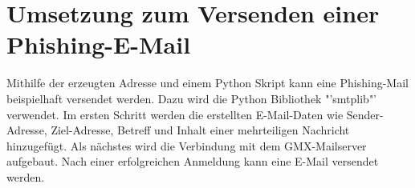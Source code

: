 \section{Umsetzung zum Versenden einer Phishing-E-Mail}
Mithilfe der erzeugten Adresse und einem Python Skript kann eine Phishing-Mail beispielhaft versendet werden. Dazu wird die Python Bibliothek "'smtplib"' verwendet. Im ersten Schritt werden die erstellten E-Mail-Daten wie Sender-Adresse, Ziel-Adresse, Betreff und Inhalt einer mehrteiligen Nachricht hinzugefügt. Als nächstes wird die Verbindung mit dem GMX-Mailserver aufgebaut. Nach einer erfolgreichen Anmeldung kann eine E-Mail versendet werden. 










	